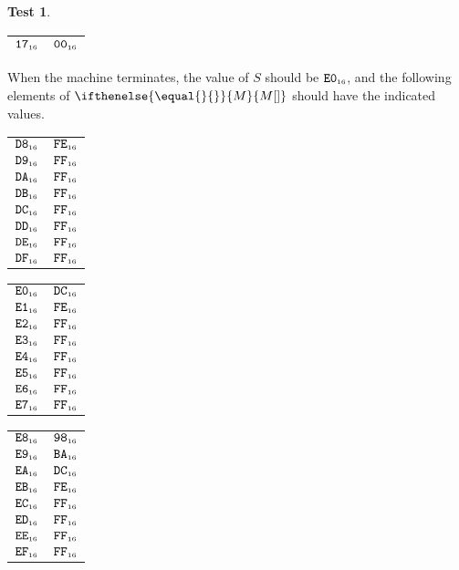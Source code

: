 \documentclass[a4paper,12pt]{article}
\makeatletter
\newcommand{\num}[1]{\texttt{#1}}
\newcommand{\hex}[1]{\num{#1}_{\textup{\tiny 16}}}
\newcommand{\MEM}[1]{\ifthenelse{\equal{#1}{}}{M}{M[#1]}}
\newcommand{\SP}{S}
\theoremstyle{definition}
\newtheorem{test}{Test}
\newenvironment{memtable}{%
  \begin{trivlist}
    \item
    }{%
    \end{trivlist}}
\newenvironment{memcolumn}{%
  \begin{tabular}{@{}ll@{}}
    \hline}
    {%
    \hline
  \end{tabular}}
\newcommand{\memspace}{\qquad}
\makeatother
\begin{document}
\begin{test}
\begin{memtable}
\begin{memcolumn}
      $\hex{17}$ & $\hex{00}$ \\
    \end{memcolumn}
  \end{memtable}
  When the machine terminates, the value of $\SP$ should be $\hex{E0}$, and the following elements of $\MEM{}$ should have the indicated values.
  \begin{memtable}
    \begin{memcolumn}
      $\hex{D8}$ & $\hex{FE}$ \\
      $\hex{D9}$ & $\hex{FF}$ \\
      $\hex{DA}$ & $\hex{FF}$ \\
      $\hex{DB}$ & $\hex{FF}$ \\
      $\hex{DC}$ & $\hex{FF}$ \\
      $\hex{DD}$ & $\hex{FF}$ \\
      $\hex{DE}$ & $\hex{FF}$ \\
      $\hex{DF}$ & $\hex{FF}$ \\
    \end{memcolumn}
    \memspace
    \begin{memcolumn}
      $\hex{E0}$ & $\hex{DC}$ \\
      $\hex{E1}$ & $\hex{FE}$ \\
      $\hex{E2}$ & $\hex{FF}$ \\
      $\hex{E3}$ & $\hex{FF}$ \\
      $\hex{E4}$ & $\hex{FF}$ \\
      $\hex{E5}$ & $\hex{FF}$ \\
      $\hex{E6}$ & $\hex{FF}$ \\
      $\hex{E7}$ & $\hex{FF}$ \\
    \end{memcolumn}
    \memspace
    \begin{memcolumn}
      $\hex{E8}$ & $\hex{98}$ \\
      $\hex{E9}$ & $\hex{BA}$ \\
      $\hex{EA}$ & $\hex{DC}$ \\
      $\hex{EB}$ & $\hex{FE}$ \\
      $\hex{EC}$ & $\hex{FF}$ \\
      $\hex{ED}$ & $\hex{FF}$ \\
      $\hex{EE}$ & $\hex{FF}$ \\
      $\hex{EF}$ & $\hex{FF}$ \\
    \end{memcolumn}
    \memspace
    \begin{memcolumn}

\end{memcolumn}
\end{memtable}
\end{test}
\end{document}

